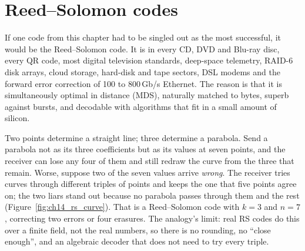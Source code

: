 
\section{Reed--Solomon codes}
\label{sec:ch14:rs}

If one code from this chapter had to be singled out as the most successful, it would be the
Reed--Solomon code. It is in every CD, DVD and Blu-ray disc, every QR code, most digital television
standards, deep-space telemetry, RAID-6 disk arrays, cloud storage, hard-disk and tape sectors, DSL
modems and the forward error correction of 100 to 800\,Gb/s Ethernet. The reason is that it is
simultaneously optimal in distance (MDS), naturally matched to bytes, superb against bursts, and
decodable with algorithms that fit in a small amount of silicon.

\begin{analogy}
Two points determine a straight line; three determine a parabola. Send a parabola not as its three
coefficients but as its values at seven points, and the receiver can lose any four of them and still
redraw the curve from the three that remain. Worse, suppose two of the seven values arrive
\emph{wrong}. The receiver tries curves through different triples of points and keeps the one that
five points agree on; the two liars stand out because no parabola passes through them and the rest
(Figure~\ref{fig:ch14_rs_curve}). That is a Reed--Solomon code with $k=3$ and $n=7$, correcting two
errors or four erasures. The analogy's limit: real RS codes do this over a finite field, not the real
numbers, so there is no rounding, no ``close enough'', and an algebraic decoder that does not need to
try every triple.
\end{analogy}


